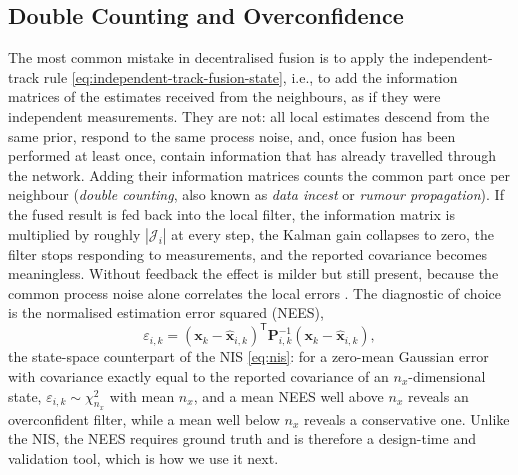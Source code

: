 \subsection{Double Counting and Overconfidence}
\label{subsec:mas-double-counting}

The most common mistake in decentralised fusion is to apply the independent-track rule \eqref{eq:independent-track-fusion-state}, i.e., to add the information matrices of the estimates received from the neighbours, as if they were independent measurements. They are not: all local estimates descend from the same prior, respond to the same process noise, and, once fusion has been performed at least once, contain information that has already travelled through the network. Adding their information matrices counts the common part once per neighbour (\emph{double counting}, also known as \emph{data incest} or \emph{rumour propagation}). If the fused result is fed back into the local filter, the information matrix is multiplied by roughly $|\mathcal{J}_i|$ at every step, the Kalman gain collapses to zero, the filter stops responding to measurements, and the reported covariance becomes meaningless. Without feedback the effect is milder but still present, because the common process noise alone correlates the local errors \cite{barshalom2011tracking}. The diagnostic of choice is the normalised estimation error squared (NEES),
\begin{equation}
\varepsilon_{i,k}=(\mathbf{x}_k-\widehat{\mathbf{x}}_{i,k})^{\mathsf T}\mathbf{P}_{i,k}^{-1}(\mathbf{x}_k-\widehat{\mathbf{x}}_{i,k}),
\label{eq:nees-mas}
\end{equation}
the state-space counterpart of the NIS \eqref{eq:nis}: for a zero-mean Gaussian error with covariance exactly equal to the reported covariance of an $n_x$-dimensional state, $\varepsilon_{i,k}\sim\chi^{2}_{n_x}$ with mean $n_x$, and a mean NEES well above $n_x$ reveals an overconfident filter, while a mean well below $n_x$ reveals a conservative one. Unlike the NIS, the NEES requires ground truth and is therefore a design-time and validation tool, which is how we use it next.

